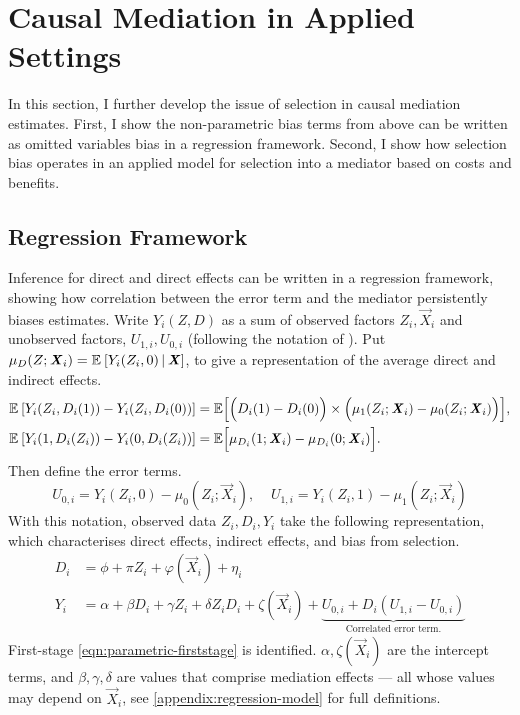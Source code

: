 \section{Causal Mediation in Applied Settings}
\label{sec:selection}
In this section, I further develop the issue of selection in causal mediation estimates. First, I show the non-parametric bias terms from above can be written as omitted variables bias in a regression framework.
Second, I show how selection bias operates in an applied model for selection into a mediator based on costs and benefits.

\subsection{Regression Framework}
\label{sec:regression}
Inference for direct and direct effects can be written in a regression framework, showing how correlation between the error term and the mediator persistently biases estimates.
Write $Y_i(Z, D)$ as a sum of observed factors $Z_i, \vec X_i$ and unobserved factors, $U_{1,i}, U_{0,i}$ (following the notation of \citealt{heckman2005structural}).
Put $\mu_D(Z; \boldsymbol{\mathit{X}}_i) = \mathbb{E}_{} \left[ Y_i(Z_i, 0) \, \middle\vert \, \boldsymbol{\mathit{X}} \right]$, to give a representation of the average direct and indirect effects.
\begin{align*}
    \mathbb{E}_{} \left[ Y_i(Z_i, D_i(1)) - Y_i(Z_i, D_i(0)) \right]
    &= \mathbb{E} \Big[ \Big( D_i(1) - D_i(0) \Big)
        \times \Big( \mu_1(Z_i; \boldsymbol{\mathit{X}}_i) - \mu_0(Z_i; \boldsymbol{\mathit{X}}_i) \Big) \Big], \\
    \mathbb{E}_{} \left[ Y_i(1, D_i(Z_i)) - Y_i(0, D_i(Z_i)) \right]
        &= \mathbb{E} \Big[ \mu_{D_i}(1; \boldsymbol{\mathit{X}}_i) - \mu_{D_i}(0; \boldsymbol{\mathit{X}}_i) \Big].
\end{align*}
Then define the error terms.
\[ U_{0,i} = Y_i(Z_i, 0) - \mu_0(Z_i; \vec X_i),\;\;\;\;
U_{1,i} = Y_i(Z_i, 1) - \mu_1(Z_i; \vec X_i) \]
With this notation, observed data $Z_i, D_i, Y_i$ take the following representation, which characterises direct effects, indirect effects, and bias from selection.
\begin{align}
    \label{eqn:parametric-firststage}
    D_i &= \phi + \pi Z_i + \varphi(\vec X_i) + \eta_i  \\
    \label{eqn:parametric-secondstage}
    Y_i &= \alpha + \beta D_i + \gamma Z_i + \delta Z_i D_i
    + \zeta(\vec X_i)
    + \underbrace{U_{0,i} + D_i \left( U_{1,i} - U_{0,i} \right)}_{
        \text{Correlated error term.}}
\end{align}
First-stage \eqref{eqn:parametric-firststage} is identified.
$\alpha, \zeta(\vec X_i)$ are the intercept terms, and $\beta, \gamma, \delta$ are values that comprise mediation effects --- all whose values may depend on $\vec X_i$, see \autoref{appendix:regression-model} for full definitions.
